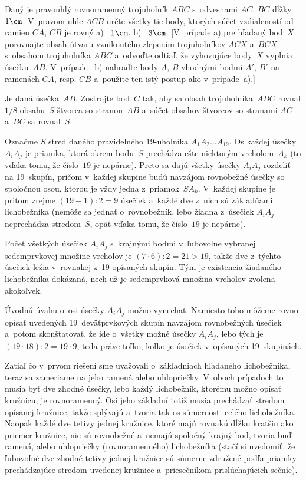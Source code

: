 {Daný je pravouhlý rovnoramenný trojuholník $ABC$ s~odvesnami $AC$, $BC$
dĺžky $1\cm$. V~pravom uhle $ACB$ určte všetky tie body, ktorých
súčet vzdialeností od ramien $CA$, $CB$ je rovný a)~ $1\cm$, b)~
$3\cm$. [V~prípade a) pre hľadaný bod~$X$ porovnajte obsah útvaru
vzniknutého zlepením trojuholníkov $ACX$ a~$BCX$ s~obsahom trojuholníka $ABC$
a~odvoďte odtiaľ, že vyhovujúce body~$X$ vyplnia úsečku~$AB$. V~prípade~
b) nahraďte body $A$, $B$ vhodnými bodmi $A'$, $B'$ na ramenách
$CA$, resp. $CB$ a~použite ten istý postup ako v~prípade~a).]

\D
Je daná úsečka~$AB$. Zostrojte bod~$C$ tak, aby sa obsah
trojuholníka~$ABC$ rovnal $1/8$ obsahu~$S$ štvorca so stranou~$AB$
a~súčet obsahov štvorcov so stranami $AC$ a~$BC$ sa rovnal~$S$.
\vpravo{[C--54--S--3]}
}

{%
Označme $S$ stred daného pravidelného $19$-uholníka
$A_1A_2\dots A_{19}$. Os každej úsečky $A_iA_j$ je priamka,
ktorá okrem bodu~$S$ prechádza
ešte niektorým vrcholom~$A_k$ (to vďaka tomu, že číslo~$19$ je nepárne).
Preto sa dajú všetky úsečky $A_iA_j$ rozdeliť na 19~skupín, pričom v~každej skupine budú navzájom
rovnobežné úsečky so spoločnou osou, ktorou je vždy
jedna z~priamok~$SA_k$.
V~každej skupine je pritom zrejme $(19-1):2=9$ úsečiek
a~každé dve z~nich sú základňami lichobežníka (nemôže sa jednať
o~rovnobežník, lebo žiadna z~úsečiek $A_iA_j$ neprechádza stredom~$S$, opäť
vďaka tomu, že číslo~$19$ je nepárne).

Počet všetkých úsečiek $A_iA_j$ s~krajnými bodmi v~ľubovoľne vybranej
sedemprvkovej množine vrcholov je $(7\cdot6):2=21>19$, takže dve
z~týchto úsečiek ležia v~rovnakej z~19 opísaných skupín. Tým je
existencia žiadaného lichobežníka dokázaná, nech už je sedemprvková
množina vrcholov zvolena akokoľvek.

\poznamka
Úvodnú úvahu o~osi úsečky $A_iA_j$ možno vynechať.
Namiesto toho môžeme rovno opísať uvedených 19~deväťprvkových skupín
navzájom rovnobežných úsečiek a~potom skonštatovať, že ide o~všetky možné
úsečky $A_iA_j$, lebo tých je $(19\cdot18):2=19\cdot9$, teda
práve toľko, koľko je úsečiek v~opísaných 19~skupinách.

\ineriesenie
Zatiaľ čo v~prvom riešení sme uvažovali
o~základniach hľadaného lichobežníka, teraz sa zameriame na jeho
ramená alebo uhlopriečky. V~oboch prípadoch to musia byť dve zhodné
úsečky, lebo každý lichobežník, ktorému možno opísať kružnicu, je
rovnoramenný. Osi jeho základní totiž musia prechádzať stredom
opísanej kružnice, takže splývajú a~tvoria tak os súmernosti
celého lichobežníka. Naopak každé dve tetivy jednej kružnice, ktoré
majú rovnakú dĺžku kratšiu ako priemer kružnice, nie sú rovnobežné
a~nemajú spoločný krajný bod, tvoria buď ramená,
alebo uhlopriečky (rovnoramenného) lichobežníka (stačí si uvedomiť,
že ľubovoľné dve zhodné tetivy jednej kružnice sú súmerne združené
podľa priamky prechádzajúce stredom uvedenej kružnice
a~priesečníkom prislúchajúcich sečníc).


}
